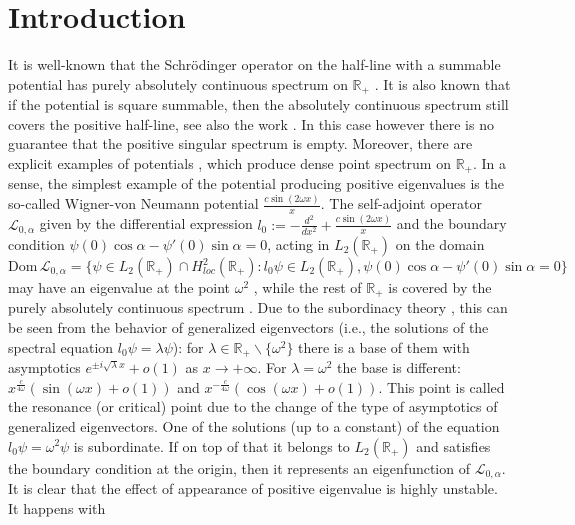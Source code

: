 \documentclass[a4paper,oneside,12pt]{amsart}
\begin{document}
\section{Introduction}
It is well-known that the Schr\"odinger operator on the half-line
with a summable potential has purely absolutely continuous
spectrum on $\mathbb R_+$ \cite{Titchmarsh-1946-1}. It is also
known \cite{Deift-Killip-1999} that if the potential is square
summable, then the absolutely continuous spectrum still covers the
positive half-line, see also the work \cite{Kiselev-1996}. In this
case however there is no guarantee that the positive singular
spectrum is empty. Moreover, there are explicit examples of
potentials \cite{Naboko-1986,Simon-1997}, which produce dense
point spectrum on $\mathbb R_+$. In a sense, the simplest example
of the potential producing positive eigenvalues is the so-called
Wigner-von Neumann potential $\frac{c\sin(2\omega x)}x$. The
self-adjoint operator $\mathcal L_{0,\alpha}$ given by the
differential expression
$l_0:=-\frac{d^2}{dx^2}+\frac{c\sin(2\omega x)}x$ and the boundary
condition $\psi(0)\cos\alpha-\psi'(0)\sin\alpha=0$, acting in
$L_2(\mathbb R_+)$ on the domain
\begin{equation*}
    \text{Dom}\,\mathcal L_{0,\alpha}=\biggl\{\psi\in L_2(\mathbb R_+)\cap H^2_{loc}(\mathbb R_+): l_0\psi\in L_2(\mathbb R_+), \psi(0)\cos\alpha-\psi'(0)\sin\alpha=0\biggr\}
\end{equation*}
may have an eigenvalue at the point $\omega^2$
\cite{Wigner-von-Neumann-1929}, while the rest of $\mathbb R_+$ is
covered by the purely absolutely continuous spectrum
\cite{Behncke-1991-I}. Due to the subordinacy theory
\cite{Gilbert-Pearson-1987}, this can be seen from the behavior of
generalized eigenvectors (i.e., the solutions of the spectral
equation $l_0\psi=\lambda\psi$): for $\lambda\in\mathbb
R_+\backslash\{\omega^2\}$ there is a base of them with
asymptotics $e^{\pm i\sqrt\lambda x}+o(1)$ as
$x\rightarrow+\infty$. For $\lambda=\omega^2$ the base is
different: $x^{\frac{c}{4\omega}}(\sin(\omega x)+o(1))$ and
$x^{-\frac{c}{4\omega}}(\cos(\omega x)+o(1))$. This point is
called the resonance (or critical) point due to the change of the
type of asymptotics of generalized eigenvectors. One of the
solutions (up to a constant) of the equation
$l_0\psi=\omega^2\psi$ is subordinate. If on top of that it
belongs to $L_2(\mathbb R_+)$ and satisfies the boundary condition
at the origin, then it represents an eigenfunction of $\mathcal
L_{0,\alpha}$. It is clear that the effect of appearance of
positive eigenvalue is highly unstable. It happens with
\end{document}
